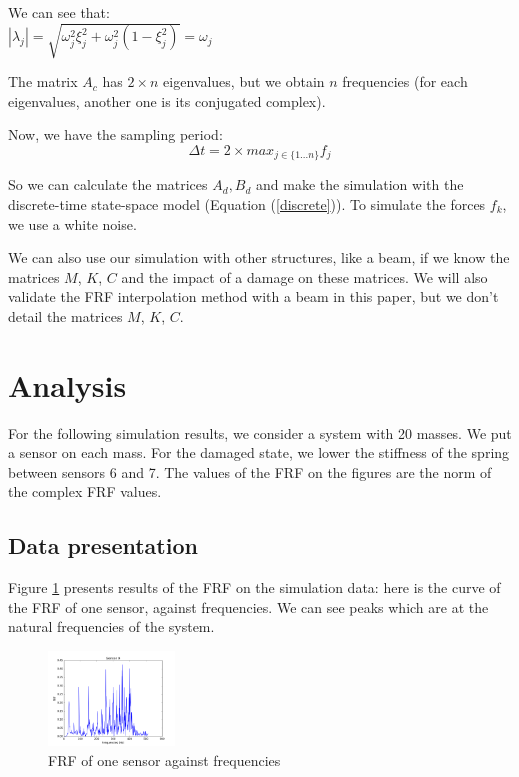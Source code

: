 \documentclass[journal]{IEEEtran}
\begin{document}
\begin{remark}
We can see that:\\
$|\lambda_j| = \sqrt{\omega_j^2 \xi_j^2 + \omega_j^2 (1 - \xi_j^2)} = \omega_j$
\end{remark}

\begin{remark}
The matrix $A_c$ has $2 \times n$ eigenvalues, but we obtain $n$ frequencies (for each eigenvalues, another one is its conjugated complex).
\end{remark}

Now, we have the sampling period:
\begin{equation}
\Delta t = 2 \times max_{j \in \{1 ... n\} } f_j
\end{equation}

So we can calculate the matrices $A_d, B_d$ and make the simulation with the discrete-time state-space model (Equation (\ref{discrete})). To simulate the forces $f_k$, we use a white noise.


We can also use our simulation with other structures, like a beam, if we know the matrices $M$, $K$, $C$ and the impact of a damage on these matrices.
We will also validate the FRF interpolation method with a beam in this paper, but we don't detail the matrices $M$, $K$, $C$.


\section{Analysis}

For the following simulation results, we consider a system with 20 masses. We put a sensor on each mass. For the damaged state, we lower the stiffness of the spring between sensors 6 and 7. The values of the FRF on the figures are the norm of the complex FRF values.


\subsection{Data presentation}

Figure \ref{frf_freq} presents results of the FRF on the simulation data: here is the curve of the FRF of one sensor, against frequencies. We can see peaks which are at the natural frequencies of the system.


\begin{figure}[h!]
  \centering
  \includegraphics[width=0.3\textwidth]{images/frf_one_sensor.png}
  \caption{FRF of one sensor against frequencies}
  \label{frf_freq}
\end{figure}
\end{document}
